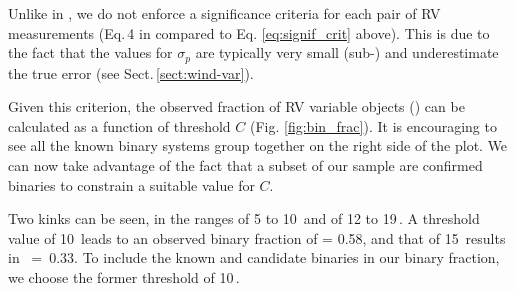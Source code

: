 Unlike in \citet{sana_vlt-flames_2013}, we do not enforce a significance criteria for each pair of RV measurements (Eq.\,4 in \citealt{sana_vlt-flames_2013} compared to Eq. \ref{eq:signif_crit} above). This is due to the fact that the values for $\sigma_p$ are typically very small (sub-\kms{}) and underestimate the true error (see Sect.\,\ref{sect:wind-var}).

Given this criterion, the observed fraction of RV variable objects (\fobsWC{}) can be calculated as a function of threshold $C$ (Fig. \ref{fig:bin_frac}). It is encouraging to see all the known binary systems group together on the right side of the plot. We can now take advantage of the fact that a subset of our sample are confirmed binaries to constrain a suitable value for $C$.

Two kinks can be seen, in the ranges of 5 to 10\,\kms{} and of 12 to 19\,\kms{}. A threshold value of 10\,\kms{} leads to an observed binary fraction of \fobsWC{} = 0.58, and that of 15\,\kms{} results in \mbox{\fobsWC{} = 0.33}. To include the known and candidate binaries in our binary fraction, we choose the former threshold of 10\,\kms{}.

